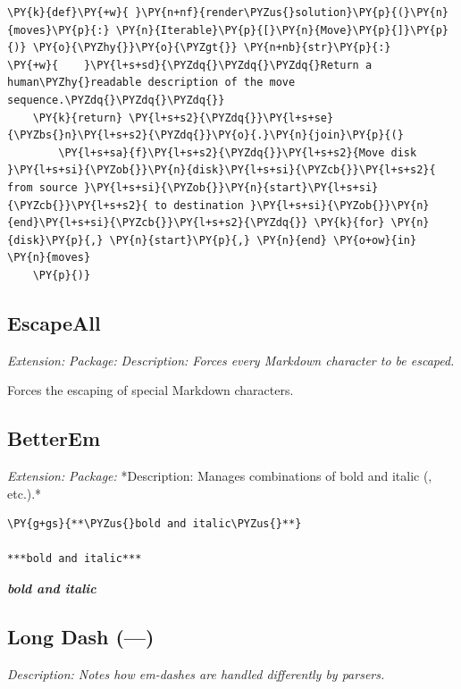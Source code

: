 \documentclass[a4paper,twoside]{article}
\begin{document}
\begin{tscode}[lang=python, engine=pygments]
\begin{Verbatim}[commandchars=\\\{\},breaklines, breakanywhere, commandchars=\\\{\}]
\PY{k}{def}\PY{+w}{ }\PY{n+nf}{render\PYZus{}solution}\PY{p}{(}\PY{n}{moves}\PY{p}{:} \PY{n}{Iterable}\PY{p}{[}\PY{n}{Move}\PY{p}{]}\PY{p}{)} \PY{o}{\PYZhy{}}\PY{o}{\PYZgt{}} \PY{n+nb}{str}\PY{p}{:}
\PY{+w}{    }\PY{l+s+sd}{\PYZdq{}\PYZdq{}\PYZdq{}Return a human\PYZhy{}readable description of the move sequence.\PYZdq{}\PYZdq{}\PYZdq{}}
    \PY{k}{return} \PY{l+s+s2}{\PYZdq{}}\PY{l+s+se}{\PYZbs{}n}\PY{l+s+s2}{\PYZdq{}}\PY{o}{.}\PY{n}{join}\PY{p}{(}
        \PY{l+s+sa}{f}\PY{l+s+s2}{\PYZdq{}}\PY{l+s+s2}{Move disk }\PY{l+s+si}{\PYZob{}}\PY{n}{disk}\PY{l+s+si}{\PYZcb{}}\PY{l+s+s2}{ from source }\PY{l+s+si}{\PYZob{}}\PY{n}{start}\PY{l+s+si}{\PYZcb{}}\PY{l+s+s2}{ to destination }\PY{l+s+si}{\PYZob{}}\PY{n}{end}\PY{l+s+si}{\PYZcb{}}\PY{l+s+s2}{\PYZdq{}} \PY{k}{for} \PY{n}{disk}\PY{p}{,} \PY{n}{start}\PY{p}{,} \PY{n}{end} \PY{o+ow}{in} \PY{n}{moves}
    \PY{p}{)}
\end{Verbatim}
\end{tscode}
\subsection{EscapeAll}
\emph{Extension: }
\emph{Package: }
\emph{Description: Forces every Markdown character to be escaped.}

Forces the escaping of special Markdown characters.
\subsection{BetterEm}
\emph{Extension: }
\emph{Package: }
*Description: Manages combinations of bold and italic (, etc.).*
\begin{tscode}[lang=md, engine=pygments]
\begin{Verbatim}[commandchars=\\\{\},breaklines, breakanywhere, commandchars=\\\{\}]
\PY{g+gs}{**\PYZus{}bold and italic\PYZus{}**}

***bold and italic***
\end{Verbatim}
\end{tscode}
\begin{displayquote}

\emph{\textbf{bold and italic}}
\end{displayquote}
\subsection{Long Dash (---)}
\emph{Description: Notes how em-dashes are handled differently by parsers.}
\end{document}
